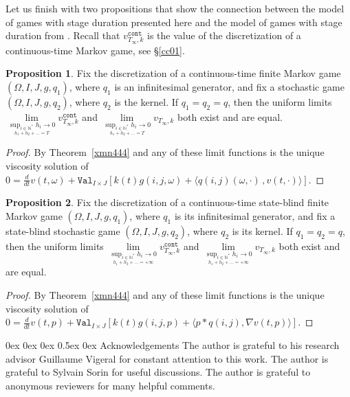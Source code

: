 \documentclass[english,openary,12pt]{article}
\makeatletter
\renewcommand\section{\@startsection {section}{1}{\z@}%
                                   {0ex \@plus 0ex \@minus 0ex}%
                                   {0.5ex \@plus0ex}%
                                   {\normalfont\LARGE\bfseries}}%
\theoremstyle{definition}
\newtheorem{proposition}{Proposition}
\newcommand{\N}{\mathbb{N}}
\makeatother
\begin{document}
Let us finish with two propositions that show the connection between the model of games with stage duration presented here and the model of games with stage duration from \cite{Sor17}. Recall that $v^{\texttt{cont}}_{T_\infty,k}$ is the value of the discretization of a continuous-time Markov game, see \S\ref{cc01}.

\begin{proposition}
\label{h3er}
Fix the discretization of a continuous-time finite Markov game $(\Omega, I, J, g, q_1)$, where $q_1$ is an infinitesimal generator, and fix a stochastic game $(\Omega, I, J, g, q_2)$, where $q_2$ is the kernel. If $q_1 = q_2 = q$, then the uniform limits
$\lim\limits_{\underset{h_1+h_2+\ldots = T}{\sup_{i\in\N^*} h_i \to 0}} 
v^{\texttt{cont}}_{T_\infty,k}$ and 
$\lim\limits_{\underset{h_1+h_2+\ldots = T}{\sup_{i\in\N^*} h_i \to 0}} 
v_{T_\infty,k}$ both exist and are equal.
\end{proposition}

\begin{proof}
By  Theorem~\ref{xmn444} and \cite[Proposition~4.3]{Sor17} any of these limit functions is the unique viscosity solution of
$0 = \frac{d}{dt} v(t,\omega) + \texttt{Val}_{I\times J} [k(t) g(i,j,\omega) + 
\langle q(i,j)(\omega,\cdot)\,, v(t,\cdot)\rangle].$
\end{proof}

\begin{proposition}
  \label{4cd6YYu}
  Fix the discretization of a continuous-time state-blind finite Markov game $(\Omega, I, J, g, q_1)$, where $q_1$ is its infinitesimal generator, and fix a state-blind stochastic game $(\Omega, I, J, g, q_2)$, where $q_2$ is its kernel. If $q_1 = q_2 = q$, then the uniform limits 
  $\lim\limits_{\underset{h_1+h_2+\ldots = +\infty}{\sup_{i\in\N^*} h_i \to 0}} 
  v^{\texttt{cont}}_{T_\infty,k}$ and 
  $\lim\limits_{\underset{h_1+h_2+\ldots = +\infty}{\sup_{i\in\N^*} h_i \to 0}} 
  v_{T_\infty,k}$ both exist and are equal.
\end{proposition}

\begin{proof}
By  Theorem~\ref{xmn444} and \cite[Proposition~5.3]{Sor17} any of these limit functions is the unique viscosity solution of
$0 = \frac{d}{dt} v(t,p) + \texttt{Val}_{I\times J} [k(t) g(i,j,p) + 
\langle p * q(i,j), \nabla v(t,p) \rangle]$.
\end{proof}

\section{Acknowledgements}
The author is grateful to his research advisor Guillaume Vigeral for constant
attention to this work. 
The author is grateful to Sylvain Sorin for useful discussions.
The author is grateful to anonymous reviewers for many helpful comments.



\end{document}

